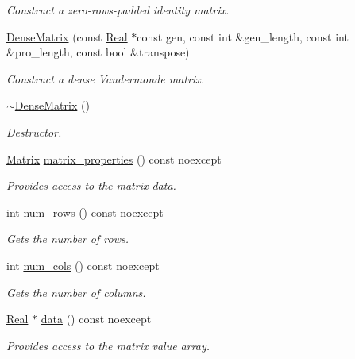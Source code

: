 \begin{DoxyCompactItemize}
\begin{DoxyCompactList}\small\item\em Construct a zero-\/rows-\/padded identity matrix. \end{DoxyCompactList}\item 
\hyperlink{classmtk_1_1DenseMatrix_acedaf4058916614d66a18381e624a21d}{Dense\+Matrix} (const \hyperlink{group__c01-roots_gac080bbbf5cbb5502c9f00405f894857d}{Real} $\ast$const gen, const int \&gen\+\_\+length, const int \&pro\+\_\+length, const bool \&transpose)
\begin{DoxyCompactList}\small\item\em Construct a dense Vandermonde matrix. \end{DoxyCompactList}\item 
\hyperlink{classmtk_1_1DenseMatrix_a8d4a0df33bd4e4edf5d2fe5539885b85}{$\sim$\+Dense\+Matrix} ()
\begin{DoxyCompactList}\small\item\em Destructor. \end{DoxyCompactList}\item 
\hyperlink{classmtk_1_1Matrix}{Matrix} \hyperlink{classmtk_1_1DenseMatrix_a5aa83a0643f27a4652ea97630edf7143}{matrix\+\_\+properties} () const noexcept
\begin{DoxyCompactList}\small\item\em Provides access to the matrix data. \end{DoxyCompactList}\item 
int \hyperlink{classmtk_1_1DenseMatrix_a53f3afb3b6a8d21854458aaa9663cc74}{num\+\_\+rows} () const noexcept
\begin{DoxyCompactList}\small\item\em Gets the number of rows. \end{DoxyCompactList}\item 
int \hyperlink{classmtk_1_1DenseMatrix_a41747502d468c6728a4be31501b16e0e}{num\+\_\+cols} () const noexcept
\begin{DoxyCompactList}\small\item\em Gets the number of columns. \end{DoxyCompactList}\item 
\hyperlink{group__c01-roots_gac080bbbf5cbb5502c9f00405f894857d}{Real} $\ast$ \hyperlink{classmtk_1_1DenseMatrix_a0c33b8a9e01d157c61ddbdf807c25d84}{data} () const noexcept
\begin{DoxyCompactList}\small\item\em Provides access to the matrix value array. \end{DoxyCompactList}\item 

\end{DoxyCompactItemize}
